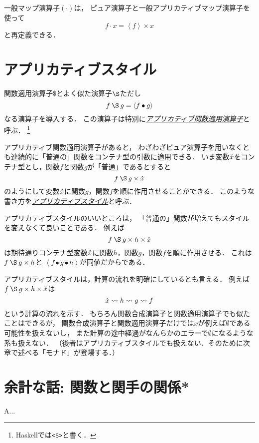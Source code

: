 \documentclass[a5paper,draft]{jsbook}
\newcommand{\programminglanguage}[1]{\textsf{#1}}
\newcommand{\haskell}{\programminglanguage{Haskell}}
\newcommand{\keyword}[1]{{\underline{\emph{#1}}}}
\newcommand{\code}[1]{\texttt{#1}}
\newcommand{\mathContainerVar}[1]{\Check{#1}}
\newcommand{\mathPureWith}[1]{\left\langle#1\right\rangle}
\newcommand{\mathNothing}{\emptyset}
\newcommand{\mathApplicativeApply}{\mathbin{\S}}
\newcommand{\mathApplicativeGeneralMap}{\mathbin{\times}}
\newcommand{\mathApply}{\mathbin{\$}}
\newcommand{\mathCompose}{\mathbin{\bullet}}
\newcommand{\mathGeneralMap}{\mathbin{\cdot}}
\begin{document}
一般マップ演算子$(\mathGeneralMap)$は，
ピュア演算子と一般アプリカティブマップ演算子を使って
$$
f\mathGeneralMap x=\mathPureWith{f}\mathApplicativeGeneralMap x
$$
と再定義できる．

\section{アプリカティブスタイル}

関数適用演算子$\mathApply$とよく似た演算子$\mathApplicativeApply$ただし
$$
f\mathApplicativeApply g=\mathPureWith{f\mathCompose g}
$$
なる演算子を導入する．
この演算子は特別に\keyword{アプリカティブ関数適用演算子}と呼ぶ．%
\footnote{\haskell では\code{<\$>}と書く．}

アプリカティブ関数適用演算子があると，
わざわざピュア演算子を用いなくとも連続的に「普通の」関数をコンテナ型の引数に適用できる．
いま変数$\mathContainerVar{x}$をコンテナ型とし，関数$f$と関数$g$が「普通」であるとすると
$$
f\mathApplicativeApply g\mathApplicativeGeneralMap\mathContainerVar{x}
$$
のようにして変数$\mathContainerVar{x}$に関数$g$，関数$f$を順に作用させることができる．
このような書き方を\keyword{アプリカティブスタイル}と呼ぶ．

アプリカティブスタイルのいいところは，
「普通の」関数が増えてもスタイルを変えなくて良いことである．
例えば
$$
f\mathApplicativeApply g\mathApplicativeGeneralMap h\mathApplicativeGeneralMap\mathContainerVar{x}
$$
は期待通りコンテナ型変数$\mathContainerVar{x}$に関数$h$，関数$g$，関数$f$を順に作用させる．
これは$f\mathApplicativeApply g\mathApplicativeGeneralMap h$と%
$\mathPureWith{f\mathCompose g\mathCompose h}$が同値だからである．

アプリカティブスタイルは，計算の流れを明確にしているとも言える．
例えば$f\mathApplicativeApply g\mathApplicativeGeneralMap h\mathApplicativeGeneralMap\mathContainerVar{x}$は
$$
\mathContainerVar{x}\leadsto h\leadsto g\leadsto f
$$
という計算の流れを示す．
もちろん関数合成演算子と関数適用演算子でも似たことはできるが，
関数合成演算子と関数適用演算子だけでは$x$が例えば$\mathNothing$である可能性を扱えないし，
また計算の途中経過がなんらかのエラーで$\mathNothing$になるような系も扱えない．
（後者はアプリカティブスタイルでも扱えない．そのために次章で述べる「モナド」が登場する．）

\section{余計な話: 関数と関手の関係*}

A...
\end{document}
